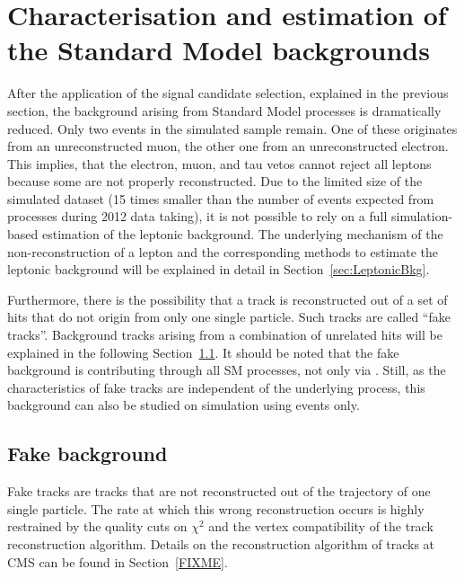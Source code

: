 \FloatBarrier
\chapter{Characterisation and estimation of the Standard Model backgrounds}
\label{sec:BackgroundEstimation}
After the application of the signal candidate selection, explained in the previous section, the background arising from Standard Model processes is dramatically reduced.
Only two events in the simulated \WJets sample remain.
One of these originates from an unreconstructed muon, the other one from an unreconstructed electron.
This implies, that the electron, muon, and tau vetos cannot reject all leptons because some are not properly reconstructed.
Due to the limited size of the simulated \WJets dataset (15 times smaller than the number of events expected from \WJets processes during 2012 data taking), 
it is not possible to rely on a full simulation-based estimation of the leptonic background.
The underlying mechanism of the non-reconstruction of a lepton and the corresponding methods to estimate the leptonic background will be explained in detail in Section~\ref{sec:LeptonicBkg}.

Furthermore, there is the possibility that a track is reconstructed out of a set of hits that do not origin from only one single particle.
Such tracks are called ``fake tracks''. 
Background tracks arising from a combination of unrelated hits will be explained in the following Section~\ref{sec:FakeBkg}.
It should be noted that the fake background is contributing through all SM processes, not only via \WJets.
Still, as the characteristics of fake tracks are independent of the underlying process, this background can also be studied on simulation using \WJets events only.



\section{Fake background}
\label{sec:FakeBkg}
Fake tracks are tracks that are not reconstructed out of the trajectory of one single particle.
The rate at which this wrong reconstruction occurs is highly restrained by the quality cuts on $\chi^2$ and the vertex compatibility of the track reconstruction algorithm.
Details on the reconstruction algorithm of tracks at CMS can be found in Section~\ref{FIXME}.


